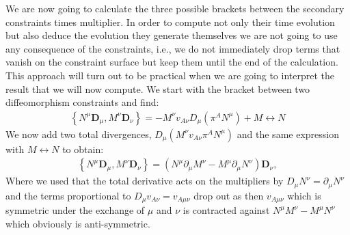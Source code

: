 We are now going to calculate the three possible brackets between the secondary constraints times multiplier. In order to compute not only their time evolution but also deduce the evolution they generate themselves we are not going to use any consequence of the constraints, i.e., we do not immediately drop terms that vanish on the constraint surface but keep them until the end of the calculation. This approach will turn out to be practical when we are going to interpret the result that we will now compute. We start with the bracket between two diffeomorphism constraints and find:
\begin{align}
    \left \{ N^{\mu}\mathbf{D}_{\mu}, M^{\nu} \mathbf{D}_\nu \right \} =
    -M^{\nu}v_{A\nu}D_{\mu}(\pi^AN^{\mu}) + M \leftrightarrow N  
\end{align}
We now add two total divergences, $D_{\mu}(M^{\nu}v_{A\nu} \pi^A N^{\mu})$ and the same expression with $M \leftrightarrow N$ to obtain:
\begin{align}
    \left \{ N^{\mu}\mathbf{D}_{\mu}, M^{\nu} \mathbf{D}_\nu \right \} = (N^\mu \partial_\mu M^\nu - M^\mu \partial_\mu N^\nu) \mathbf{D}_\nu,
\end{align}
Where we used that the total derivative acts on the multipliers by $D_\mu N^{\nu} = \partial_\mu N^\nu$ and the terms proportional to $D_\mu v_{A\nu} = v_{A\mu \nu}$ drop out as then $v_{A\mu \nu}$ which is symmetric under the exchange of $\mu$ and $\nu$ is contracted against $N^\mu M^\nu - M^\mu N^\nu$ which obviously is anti-symmetric. 

